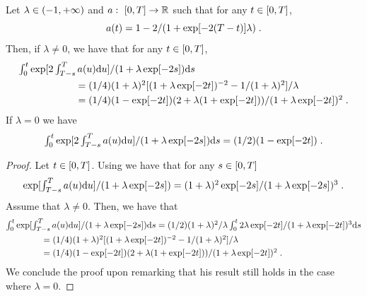   \begin{lemma}
  \label{lemma:integral_exp_duo}
  Let $\lambda \in \left(-1, +\infty\right)$ and $a: \ \left[0,T\right] \to \mathbb{R}$ such
  that for any $t \in \left[0,T\right]$,
  \begin{equation}
    a(t) = 1 - 2/(1 + \exp[-2(T-t)]\lambda) \; . 
  \end{equation}
  Then, if $\lambda \neq 0$, we have that for any $t \in \left[0,T\right]$,
  \begin{align}
    &\textstyle{
      \int_0^t \exp[ 2\int_{T-s}^T a(u) \mathrm{d}u]/(1 + \lambda \exp[-2s]) \mathrm{d}s} \\
    & \qquad \qquad \qquad \textstyle{= (1/4)(1+\lambda)^2 [(1 + \lambda \exp[-2t])^{-2} - 1/(1+\lambda)^2]/\lambda 
      } \\
    & \qquad \qquad \qquad \textstyle{=   (1/4)(1 - \exp[-2t])(2 + \lambda (1 + \exp[-2t]))/(1 + \lambda \exp[-2t])^2 } \; . 
    \end{align}
    If $\lambda =0$ we have
    \begin{equation}
      \label{eq:2}
      \textstyle{
        \int_0^t \exp[ 2\int_{T-s}^T a(u) \mathrm{d}u]/(1 + \lambda \exp[-2s]) \mathrm{d}s = (1/2)(1 - \exp[-2t]) \;. 
        }
    \end{equation}

  \end{lemma}

  \begin{proof}
    Let $t \in \left[0,T\right]$. Using  we have that for any $s \in \left[0,T\right]$
    \begin{equation}
      \textstyle{ \exp[\int_{T-s}^T a(u) \mathrm{d}u]/(1 + \lambda \exp[-2s]) = (1+\lambda)^2 \exp[-2s] / (1 + \lambda \exp[-2s])^3 \;.} 
    \end{equation}
    Assume that $\lambda \neq 0$. Then, we have that
    \begin{align}
      &\textstyle{\int_0^t \exp[\int_{T-s}^T a(u) \mathrm{d}u]/(1 + \lambda \exp[-2s]) \mathrm{d}s } = \textstyle{(1/2)(1+\lambda)^2/\lambda\int_0^t 2 \lambda \exp[-2t]/(1 + \lambda \exp[-2t])^3 \mathrm{d}s} \\
                                                                  & \qquad \qquad = \textstyle{(1/4)(1+\lambda)^2 [(1 + \lambda \exp[-2t])^{-2} - 1/(1+\lambda)^2]/\lambda  } \\
      & \qquad \qquad = \textstyle{  (1/4)(1 - \exp[-2t])(2 + \lambda (1 + \exp[-2t]))/(1 + \lambda \exp[-2t])^2  } \; .
    \end{align}
    We conclude the proof upon remarking that his result still holds in the case where $\lambda =0$.
  \end{proof}

